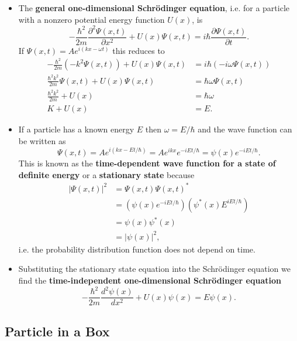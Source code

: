 \documentclass{article}
\begin{document}
\begin{itemize}
  \item The \textbf{general one-dimensional Schrödinger equation}, i.e. for a particle with a nonzero potential energy function $U(x)$, is \[-\frac{\hbar^2}{2 m} \frac{\partial^2 \Psi(x, t)}{\partial x^2} + U(x) \Psi(x, t) = i \hbar \frac{\partial \Psi(x, t)}{\partial t}.\] If $\Psi(x, t) = A e^{i (k x - \omega t)}$ this reduces to \begin{align*}
          -\frac{\hbar^2}{2 m} (-k^2 \Psi(x, t)) + U(x) \Psi(x, t) & = i \hbar (-i \omega \Psi(x, t)) \\
          \frac{\hbar^2 k^2}{2 m} \Psi(x, t) + U(x) \Psi(x, t)     & = \hbar \omega \Psi(x, t)        \\
          \frac{\hbar^2 k^2}{2 m} + U(x)                           & = \hbar \omega                   \\
          K + U(x)                                                 & = E.
        \end{align*}

  \item If a particle has a known energy $E$ then $\omega = E / \hbar$ and the wave function can be written as \[\Psi(x, t) = A e^{i (k x - E t / \hbar)} = A e^{i k x} e^{-i E t / \hbar} = \psi(x) e^{-i E t / \hbar}.\] This is known as the \textbf{time-dependent wave function for a state of definite energy} or a \textbf{stationary state} because \begin{align*}
          |\Psi(x, t)|^2 & = \Psi(x, t) \Psi(x, t)^*                                    \\
                         & = (\psi(x) e^{-i E t / \hbar}) (\psi^*(x) E^{i E t / \hbar}) \\
                         & = \psi(x) \psi^*(x)                                          \\
                         & = |\psi(x)|^2,
        \end{align*} i.e. the probability distribution function does not depend on time.

  \item Substituting the stationary state equation into the Schrödinger equation we find the \textbf{time-independent one-dimensional Schrödinger equation} \[-\frac{\hbar^2}{2 m} \frac{d^2 \psi(x)}{d x^2} + U(x) \psi(x) = E \psi(x).\]
\end{itemize}

\subsection{Particle in a Box}
\end{document}
